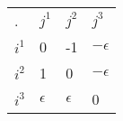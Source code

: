 \begin{center}
    \begin{tabular}{llll}
    .                          & $j^1$      & $j^2$      & $j^3$                            \\ \cline{2-4}
    \multicolumn{1}{l|}{$i^1$} & 0          & -1         & \multicolumn{1}{l|}{$-\epsilon$} \\
    \multicolumn{1}{l|}{$i^2$} & 1          & 0          & \multicolumn{1}{l|}{$-\epsilon$} \\
    \multicolumn{1}{l|}{$i^3$} & $\epsilon$ & $\epsilon$ & \multicolumn{1}{l|}{0}           \\ \cline{2-4}
    \end{tabular}
\end{center}